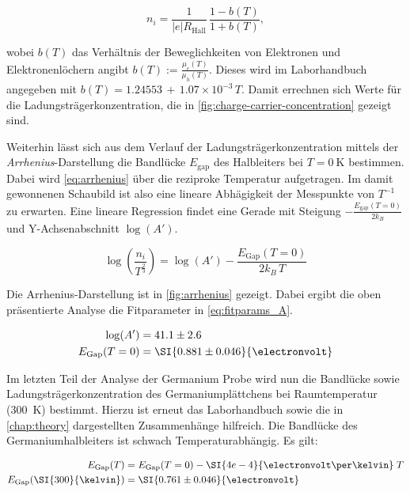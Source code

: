 \begin{equation}
\label{eq:ccc}
	n_i = \frac{1}{|e|R_\text{Hall}}\,\frac{1-b(T)}{1+b(T)},
\end{equation}

wobei $b(T)$ das Verhältnis der Beweglichkeiten von Elektronen und Elektronenlöchern
angibt $b(T):=\frac{\mu_e(T)}{\mu_h(T)}$. Dieses wird im Laborhandbuch angegeben mit
$b(T) = 1.24553\,+\,1.07\times10^{-3}\,T$. Damit errechnen sich Werte für die
Ladungsträgerkonzentration, die in \autoref{fig:charge-carrier-concentration} gezeigt
sind.

Weiterhin lässt sich aus dem Verlauf der Ladungsträgerkonzentration mittels der 
\textit{Arrhenius}-Darstellung die Bandlücke $E_\text{gap}$ des Halbleiters 
bei $T=\SI{0}{\kelvin}$ bestimmen. Dabei wird \autoref{eq:arrhenius} über die 
reziproke Temperatur aufgetragen. Im damit gewonnenen Schaubild ist also eine lineare
Abhägigkeit der Messpunkte von $T^{-1}$ zu erwarten. Eine lineare Regression findet 
eine Gerade mit Steigung $-\frac{E_\text{gap}(T=0)}{2k_B}$ und Y-Achsenabschnitt
$\log(A')$.

\begin{equation}
\label{eq:arrhenius}
	\log\left( \frac{n_i}{T^\frac{2}{3}}\right) = \log(A') - \frac{E_\text{Gap}(T=0)}{2k_B\,T}
\end{equation}

Die Arrhenius-Darstellung ist in \autoref{fig:arrhenius} gezeigt. Dabei ergibt die 
oben präsentierte Analyse die Fitparameter in \autoref{eq:fitparams_A}. 

\begin{align}
\label{eq:fitparams_A}
	\log(A') &= 41.1\pm2.6 \\
	E_\text{Gap}(T=0) &= \SI{0.881\pm0.046}{\electronvolt} 
\end{align}

Im letzten Teil der Analyse der Germanium Probe wird nun die Bandlücke sowie
Ladungsträgerkonzentration des Germaniumplättchens bei Raumtemperatur 
(\SI{300}{\kelvin}) bestimmt. Hierzu ist erneut das Laborhandbuch \cite{Manual} sowie
die in \autoref{chap:theory} dargestellten Zusammenhänge hilfreich. Die Bandlücke 
des Germaniumhalbleiters ist schwach Temperaturabhängig. Es gilt:

\begin{align*}
E_\text{Gap}(T) &= E_\text{Gap}(T=0) - \SI{4e-4}{\electronvolt\per\kelvin}\;T \\
	E_\text{Gap}(\SI{300}{\kelvin}) &= \SI{0.761\pm0.046}{\electronvolt}
\end{align*}


